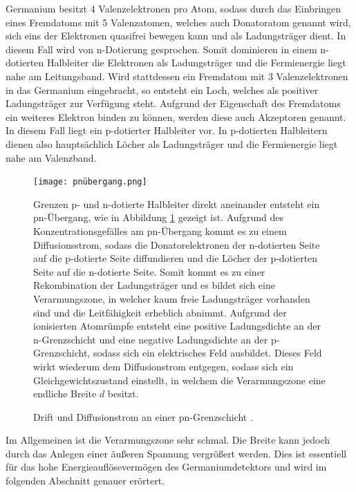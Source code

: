 Germanium besitzt 4 Valenzelektronen pro Atom, sodass durch das Einbringen eines Fremdatoms mit 5 Valenzatomen, welches auch Donatoratom genannt wird, sich eins der Elektronen quasifrei bewegen kann und als Ladungsträger dient.
In diesem Fall wird von n-Dotierung gesprochen.
Somit dominieren in einem n-dotierten Halbleiter die Elektronen als Ladungsträger und die Fermienergie liegt nahe am Leitungsband.
Wird stattdessen ein Fremdatom mit 3 Valenzelektronen in das Germanium eingebracht, so entsteht ein Loch, welches als positiver Ladungsträger zur Verfügung steht.
Aufgrund der Eigenschaft des Fremdatoms ein weiteres Elektron binden zu können, werden diese auch Akzeptoren genannt. In diesem Fall liegt ein p-dotierter Halbleiter vor.
In p-dotierten Halbleitern dienen also hauptsächlich Löcher als Ladungsträger und die Fermienergie liegt nahe am Valenzband.

\FloatBarrier
\begin{figure}[h]
\begin{minipage}[t]{0.45\textwidth}
\vspace{10pt}
\centering
\texttt{[image: pnübergang.png]}
\caption{Drift und Diffusionstrom an einer pn-Grenzschicht \cite{quelle03}.}
\label{fig:tfig6}
\end{minipage}
\hfill
\begin{minipage}[t]{0.53\textwidth}
\vspace{0pt}
Grenzen p- und n-dotierte Halbleiter direkt aneinander entsteht ein pn-Übergang, wie in Abbildung \ref{fig:tfig6} gezeigt ist.
Aufgrund des Konzentrationsgefälles am pn-Übergang kommt es zu einem Diffusionsstrom, sodass die Donatorelektronen der n-dotierten Seite auf die p-dotierte Seite diffundieren und die Löcher der p-dotierten Seite auf die n-dotierte Seite.
Somit kommt es zu einer Rekombination der Ladungsträger und es bildet sich eine Verarmungszone, in welcher kaum freie Ladungsträger vorhanden sind und die Leitfähigkeit erheblich abnimmt.
Aufgrund der ionisierten Atomrümpfe entsteht eine positive Ladungsdichte an der n-Grenzschicht und eine negative Ladungsdichte an der p-Grenzschicht, sodass sich ein elektrisches Feld ausbildet.
Dieses Feld wirkt wiederum dem Diffusionstrom entgegen, sodass sich ein Gleichgewichtszustand einstellt, in welchem die Verarmungszone eine endliche Breite $d$ besitzt.
\end{minipage}
\end{figure}
\FloatBarrier
Im Allgemeinen ist die Verarmungszone sehr schmal. 
Die Breite kann jedoch durch das Anlegen einer äußeren Spannung vergrößert werden. 
Dies ist essentiell für das hohe Energieauflösevermögen des Germaniumdetektors und wird im folgenden Abschnitt genauer erörtert.


